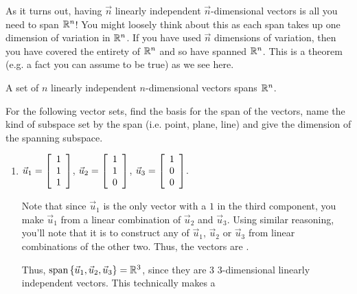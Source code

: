 \documentclass{ximera}
\begin{document}
As it turns out, having $\vec{n}$ linearly independent $\vec{n}$-dimensional vectors is all you need to span $\RR^n$! You might loosely think about this as each span takes up one dimension of variation in $\RR^n$. If you have used $\vec{n}$ dimensions of variation, then you have covered the entirety of $\RR^n$ and so have spanned $\RR^n$. This is a theorem (e.g. a fact you can assume to be true) as we see here.

\begin{theorem}
  A set of $n$ linearly independent $n$-dimensional vectors spans $\RR^n$.
\end{theorem}

\begin{example}

  For the following vector sets, find the basis for the span of the vectors, name the kind of subspace set by the span (i.e. point, plane, line) and give the dimension of the spanning subspace.

  \begin{enumerate}

    \item $\vect{u}_1=\startmat{r} 1 \\ 1 \\ 1 \stopmat$, $\vect{u}_2=\startmat{r} 1 \\ 1 \\ 0 \stopmat$, $\vect{u}_3=\startmat{r} 1 \\ 0 \\ 0 \stopmat$.
    
    \begin{solution}
    
      Note that since $\vec{u}_1$ is the only vector with a $1$ in the third component, you  make $\vec{u}_1$ from a linear combination of $\vec{u}_2$ and $\vec{u}_3$. Using similar reasoning, you'll note that it is  to construct any of $\vec{u}_1$, $\vec{u}_2$ or $\vec{u}_3$ from linear combinations of the other two. Thus, the vectors are . 
      
      Thus, $\sspan\set{\vect{u}_1,\vect{u}_2,\vec{u}_3}=\R^3$, since they are 3 $3$-dimensional linearly independent vectors. This technically makes a 

    \end{solution}


\end{enumerate}
\end{example}
\end{document}
